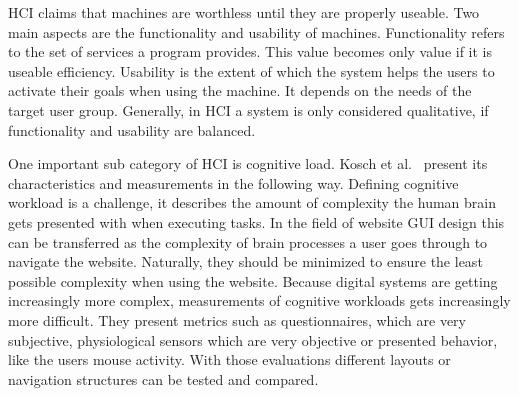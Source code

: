 \ac{HCI} claims that machines are worthless until they are properly useable. Two main aspects are the functionality and usability of machines.
Functionality refers to the set of services a program provides. This value becomes only value if it is useable efficiency.
Usability is the extent of which the system helps the users to activate their goals when using the machine. It depends on the needs of the target user group.
Generally, in \ac{HCI} a system is only considered qualitative, if functionality and usability are balanced.

One important sub category of \ac{HCI} is cognitive load. Kosch et al.~\cite{kosch_survey_2023} present its characteristics and measurements in the following way. 
Defining cognitive workload is a challenge, it describes the amount of complexity the human brain gets presented with when executing tasks. In the field of website \ac{GUI} design this can be transferred as the complexity of brain processes a user goes through to navigate the website. Naturally, they should be minimized to ensure the least possible complexity when using the website. %
Because digital systems are getting increasingly more complex, measurements of cognitive workloads gets increasingly more difficult. They present metrics such as questionnaires, which are very subjective, physiological sensors which are very objective or presented behavior, like the users mouse activity.
With those evaluations different layouts or navigation structures can be tested and compared. 


